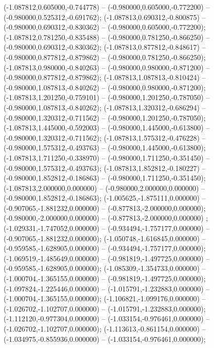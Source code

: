  (-1.087812,0.605000,-0.744778) -- (-0.980000,0.605000,-0.772200) -- (-0.980000,0.525312,-0.691762);
 (-1.087813,0.690312,-0.800875) -- (-0.980000,0.690312,-0.830362) -- (-0.980000,0.605000,-0.772200);
 (-1.087812,0.781250,-0.835488) -- (-0.980000,0.781250,-0.866250) -- (-0.980000,0.690312,-0.830362);
 (-1.087813,0.877812,-0.848617) -- (-0.980000,0.877812,-0.879862) -- (-0.980000,0.781250,-0.866250);
 (-1.087813,0.980000,-0.840263) -- (-0.980000,0.980000,-0.871200) -- (-0.980000,0.877812,-0.879862);
 (-1.087813,1.087813,-0.810424) -- (-0.980000,1.087813,-0.840262) -- (-0.980000,0.980000,-0.871200);
 (-1.087813,1.201250,-0.759101) -- (-0.980000,1.201250,-0.787050) -- (-0.980000,1.087813,-0.840262);
 (-1.087813,1.320312,-0.686294) -- (-0.980000,1.320312,-0.711562) -- (-0.980000,1.201250,-0.787050);
 (-1.087813,1.445000,-0.592003) -- (-0.980000,1.445000,-0.613800) -- (-0.980000,1.320312,-0.711562);
 (-1.087813,1.575312,-0.476228) -- (-0.980000,1.575312,-0.493763) -- (-0.980000,1.445000,-0.613800);
 (-1.087813,1.711250,-0.338970) -- (-0.980000,1.711250,-0.351450) -- (-0.980000,1.575312,-0.493763);
 (-1.087813,1.852812,-0.180227) -- (-0.980000,1.852812,-0.186863) -- (-0.980000,1.711250,-0.351450);
 (-1.087813,2.000000,0.000000) -- (-0.980000,2.000000,0.000000) -- (-0.980000,1.852812,-0.186863);
 (-1.005625,-1.875111,0.000000) -- (-0.907065,-1.881232,0.000000) -- (-0.877813,-2.000000,0.000000);
 (-0.980000,-2.000000,0.000000) -- (-0.877813,-2.000000,0.000000) ;
 (-1.029331,-1.747052,0.000000) -- (-0.934494,-1.757177,0.000000) -- (-0.907065,-1.881232,0.000000);
 (-1.050748,-1.616845,0.000000) -- (-0.959585,-1.628905,0.000000) -- (-0.934494,-1.757177,0.000000);
 (-1.069519,-1.485649,0.000000) -- (-0.981819,-1.497725,0.000000) -- (-0.959585,-1.628905,0.000000);
 (-1.085309,-1.354733,0.000000) -- (-1.000704,-1.365155,0.000000) -- (-0.981819,-1.497725,0.000000);
 (-1.097824,-1.225446,0.000000) -- (-1.015791,-1.232883,0.000000) -- (-1.000704,-1.365155,0.000000);
 (-1.106821,-1.099176,0.000000) -- (-1.026702,-1.102707,0.000000) -- (-1.015791,-1.232883,0.000000);
 (-1.112120,-0.977304,0.000000) -- (-1.033154,-0.976461,0.000000) -- (-1.026702,-1.102707,0.000000);
 (-1.113613,-0.861154,0.000000) -- (-1.034975,-0.855936,0.000000) -- (-1.033154,-0.976461,0.000000);
